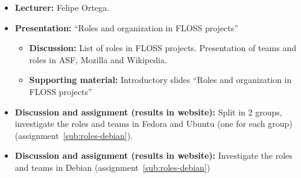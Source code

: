 \documentclass[a4paper]{article}
\begin{document}
\begin{itemize}
\item \textbf{Lecturer:} Felipe Ortega.
\item \textbf{Presentation:} ``Roles and organization in FLOSS projects''
  \begin{itemize}
  \item \textbf{Discussion:} List of roles in FLOSS projects. Presentation of teams and roles in ASF, Mozilla and Wikipedia.
  \item \textbf{Supporting material:} Introductory slides ``Roles and organization in FLOSS projects''
  \end{itemize}
\item \textbf{Discussion and assignment (results in website):} Split in 2 groups, investigate the roles and teams in Fedora and Ubuntu (one for each group) (assignment~\ref{sub:roles-debian}).
\item \textbf{Discussion and assignment (results in website):} Investigate the roles and teams in Debian (assignment~\ref{sub:roles-debian})
\end{itemize}
\end{document}
